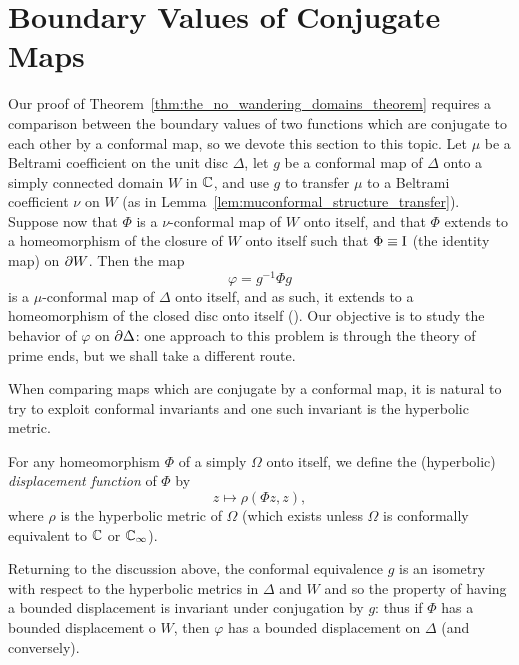 \section{Boundary Values of Conjugate Maps}
\label{sec:boundary_values_of_conjugate_maps}

Our proof of Theorem~\ref{thm:the_no_wandering_domains_theorem} requires a
comparison between the boundary values of two functions which are conjugate to
each other by a conformal map, so we devote this section to this topic. Let
$\mu$ be a Beltrami coefficient on the unit disc $\Delta$, let $g$ be a
conformal map of $\Delta$ onto a simply connected domain $W$ in $\mathbb{C}$, and use
$g$ to transfer $\mu$ to a Beltrami coefficient $\nu$ on $W$ (as in
Lemma~\ref{lem:muconformal_structure_transfer}). Suppose now that $\Phi$ is a
$\nu$-conformal map of $W$ onto itself, and that $\Phi$ extends to a
homeomorphism of the closure of $W$ onto itself such that $\Phi \equiv \mathrm{I}$ (the
identity map) on $\partial {W}$. Then the map
\begin{equation*}
    \varphi = g^{-1} \Phi g
\end{equation*}
is a $\mu$-conformal map of $\Delta$ onto itself, and as such, it extends to a
homeomorphism of the closed disc onto itself (\cite[47]{Ahlfors2006}). Our
objective is to study the behavior of $\varphi$ on $\partial {\Delta}$: one
approach to this problem is through the theory of prime ends, but we shall take
a different route.

When comparing maps which are conjugate by a conformal map, it is natural to try
to exploit conformal invariants and one such invariant is the hyperbolic metric.

\begin{definition}
    For any homeomorphism $\Phi$ of a simply $\Omega$ onto itself, we define the
    (hyperbolic) \emph{displacement function} of $\Phi$ by
    \begin{equation*}
        z \mapsto \rho(\Phi z, z),
    \end{equation*}
    where $\rho$ is the hyperbolic metric of $\Omega$ (which exists unless
    $\Omega$ is conformally equivalent to $\mathbb{C}$ or $\mathbb{C}_\infty$).
\end{definition}

\begin{remark}
    Returning to the discussion above, the conformal equivalence $g$ is an
    isometry with respect to the hyperbolic metrics in $\Delta$ and $W$ and so
    the property of having a bounded displacement is invariant under conjugation
    by $g$: thus if $\Phi$ has a bounded displacement o $W$, then $\varphi$ has
    a bounded displacement on $\Delta$ (and conversely).
\end{remark}

